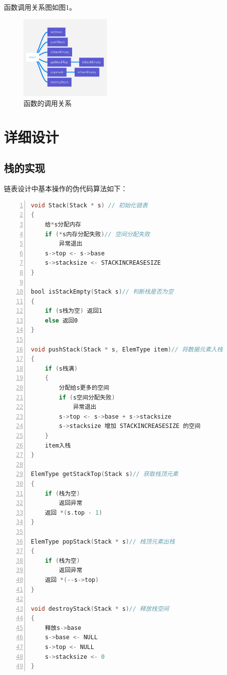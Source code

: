 \documentclass{article}
\begin{document}
函数调用关系图如图1。

\begin{figure}[htbp]
    
    \centering\includegraphics[width=0.4\textwidth]{./Images/pic2_1.png}
    
    \caption{函数的调用关系}
    
\end{figure}

\section{详细设计}

\subsection{栈的实现}

链表设计中基本操作的伪代码算法如下：
\begin{lstlisting}[language={C},
    numbers=left,
    numberstyle=\tiny\consolas,
    basicstyle=\small\consolas]
void Stack(Stack * s) // 初始化链表
{    
    给*s分配内存
    if (*s内存分配失败)// 空间分配失败
        异常退出
    s->top <- s->base
    s->stacksize <- STACKINCREASESIZE
}

bool isStackEmpty(Stack s)// 判断栈是否为空
{
    if (s栈为空) 返回1
    else 返回0
}

void pushStack(Stack * s, ElemType item)// 将数据元素入栈
{
    if (s栈满) 
    {
        分配给s更多的空间
        if (s空间分配失败)
            异常退出
        s->top <- s->base + s->stacksize
        s->stacksize 增加 STACKINCREASESIZE 的空间
    }
    item入栈
}

ElemType getStackTop(Stack s)// 获取栈顶元素
{
    if (栈为空)
        返回异常
    返回 *(s.top - 1)
}

ElemType popStack(Stack * s)// 栈顶元素出栈
{
    if (栈为空)
        返回异常 
    返回 *(--s->top)
}

void destroyStack(Stack * s)// 释放栈空间
{
    释放s->base
    s->base <- NULL
    s->top <- NULL
    s->stacksize <- 0
}
\end{lstlisting}
\end{document}
